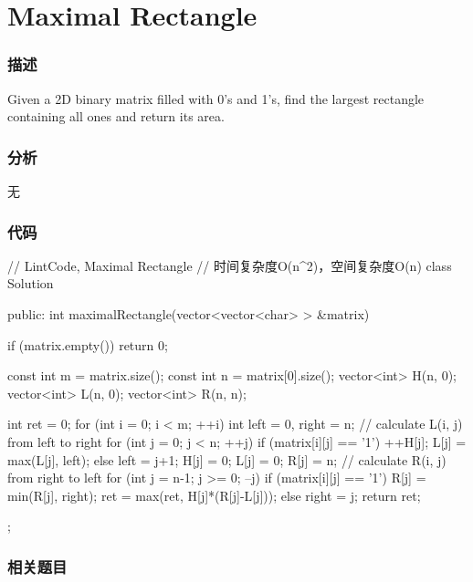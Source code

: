 \section{Maximal Rectangle} %
\label{sec:maximal-rectangle}


\subsubsection{描述}
Given a 2D binary matrix filled with 0's and 1's, find the largest rectangle containing all ones and return its area.


\subsubsection{分析}
无


\subsubsection{代码}
\begin{Code}
// LintCode, Maximal Rectangle
// 时间复杂度O(n^2)，空间复杂度O(n)
class Solution {
public:
    int maximalRectangle(vector<vector<char> > &matrix) {
        if (matrix.empty())  return 0;

        const int m = matrix.size();
        const int n = matrix[0].size();
        vector<int> H(n, 0);
        vector<int> L(n, 0);
        vector<int> R(n, n);

        int ret = 0;
        for (int i = 0; i < m; ++i) {
            int left = 0, right = n;
            // calculate L(i, j) from left to right
            for (int j = 0; j < n; ++j) {
                if (matrix[i][j] == '1') {
                    ++H[j];
                    L[j] = max(L[j], left);
                } else {
                    left = j+1;
                    H[j] = 0; L[j] = 0; R[j] = n;
                }
            }
            // calculate R(i, j) from right to left
            for (int j = n-1; j >= 0; --j) {
                if (matrix[i][j] == '1') {
                    R[j] = min(R[j], right);
                    ret = max(ret, H[j]*(R[j]-L[j]));
                } else {
                    right = j;
                }
            }
        }
        return ret;
    }
};
\end{Code}


\subsubsection{相关题目}

